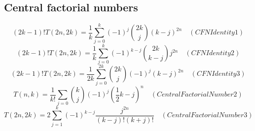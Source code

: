 \subsection{Central factorial numbers}\label{subsec:central-factorial-numbers}

\begin{equation*}
(2k-1)
    !T(2n,2k) = \frac{1}{k} \sum_{j=0}^{k} (-1)^j \binom{2k}{j} (k-j)^{2n} \quad
    (CFNIdentity1)
\end{equation*}
\begin{equation*}
(2k-1)
    !T(2n,2k) = \frac{1}{k} \sum_{j=0}^{k} (-1)^{k-j} \binom{2k}{k-j} j^{2n} \quad
    (CFNIdentity2)
\end{equation*}
\begin{equation*}
(2k-1)
    !T(2n, 2k) = \frac{1}{2k} \sum_{j=0}^{2k} \binom{2k}{j} (-1)^{j} (k-j)^{2n} \quad
    (CFNIdentity3)
\end{equation*}
\begin{equation*}
    T(n,k) = \frac{1}{k!} \sum_{j=0} \binom{k}{j} (-1)^{j} \left( \frac{1}{2}k - j \right)^{n} \quad
    (CentralFactorialNumber2)
\end{equation*}
\begin{equation*}
    T(2n,2k) = 2 \sum_{j=1}^{k} (-1)^{k-j} \frac{j^{2n}}{(k-j)! (k+j)!} \quad
    (CentralFactorialNumber3)
\end{equation*}